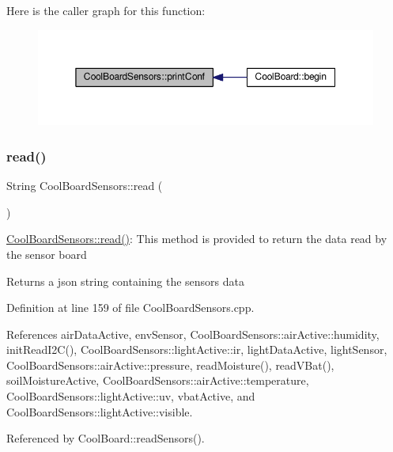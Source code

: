 Here is the caller graph for this function\+:\nopagebreak
\begin{figure}[H]
\begin{center}
\leavevmode
\includegraphics[width=350pt]{classCoolBoardSensors_af6fd79505815b204c178617ecf54c873_icgraph}
\end{center}
\end{figure}
\mbox{\label{classCoolBoardSensors_a91badb2539d91fda8679f2a597874c48}} 
\subsubsection{\texorpdfstring{read()}{read()}}
{\footnotesize\ttfamily String Cool\+Board\+Sensors\+::read (\begin{DoxyParamCaption}{ }\end{DoxyParamCaption})}

\hyperlink{classCoolBoardSensors_a91badb2539d91fda8679f2a597874c48}{Cool\+Board\+Sensors\+::read()}\+: This method is provided to return the data read by the sensor board

\begin{DoxyReturn}{Returns}
a json string containing the sensors data 
\end{DoxyReturn}


Definition at line 159 of file Cool\+Board\+Sensors.\+cpp.



References air\+Data\+Active, env\+Sensor, Cool\+Board\+Sensors\+::air\+Active\+::humidity, init\+Read\+I2\+C(), Cool\+Board\+Sensors\+::light\+Active\+::ir, light\+Data\+Active, light\+Sensor, Cool\+Board\+Sensors\+::air\+Active\+::pressure, read\+Moisture(), read\+V\+Bat(), soil\+Moisture\+Active, Cool\+Board\+Sensors\+::air\+Active\+::temperature, Cool\+Board\+Sensors\+::light\+Active\+::uv, vbat\+Active, and Cool\+Board\+Sensors\+::light\+Active\+::visible.



Referenced by Cool\+Board\+::read\+Sensors().


